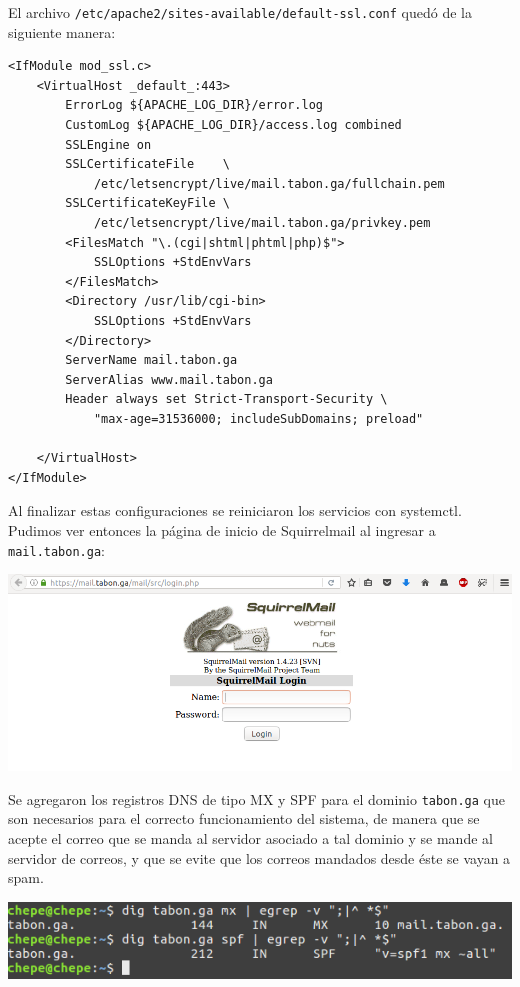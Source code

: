 \documentclass[12pt]{article}
\begin{document}
El archivo \texttt{/etc/apache2/sites-available/default-ssl.conf} quedó de la siguiente manera:
\begin{verbatim}
<IfModule mod_ssl.c>
    <VirtualHost _default_:443>
        ErrorLog ${APACHE_LOG_DIR}/error.log
        CustomLog ${APACHE_LOG_DIR}/access.log combined
        SSLEngine on
        SSLCertificateFile    \
            /etc/letsencrypt/live/mail.tabon.ga/fullchain.pem
        SSLCertificateKeyFile \
            /etc/letsencrypt/live/mail.tabon.ga/privkey.pem
        <FilesMatch "\.(cgi|shtml|phtml|php)$">
            SSLOptions +StdEnvVars
        </FilesMatch>
        <Directory /usr/lib/cgi-bin>
            SSLOptions +StdEnvVars
        </Directory>
        ServerName mail.tabon.ga
        ServerAlias www.mail.tabon.ga
        Header always set Strict-Transport-Security \
            "max-age=31536000; includeSubDomains; preload"
 
    </VirtualHost>
</IfModule>
\end{verbatim}

Al finalizar estas configuraciones se reiniciaron los servicios con \textsf{systemctl}. \\

Pudimos ver entonces la página de inicio de Squirrelmail al ingresar a \texttt{mail.tabon.ga}: \\
\begin{center}
\includegraphics[scale=0.4]{mail/04} \\
\end{center}

Se agregaron los registros DNS de tipo MX y SPF para el dominio \texttt{tabon.ga} que son necesarios para el correcto funcionamiento del sistema, de manera que se acepte el correo que se manda al servidor asociado a tal dominio y se mande al servidor de correos, y que se evite que los correos mandados desde éste se vayan a spam. \\

\begin{center}
\includegraphics[scale=0.5]{mail/01} \\
\end{center}
\end{document}

